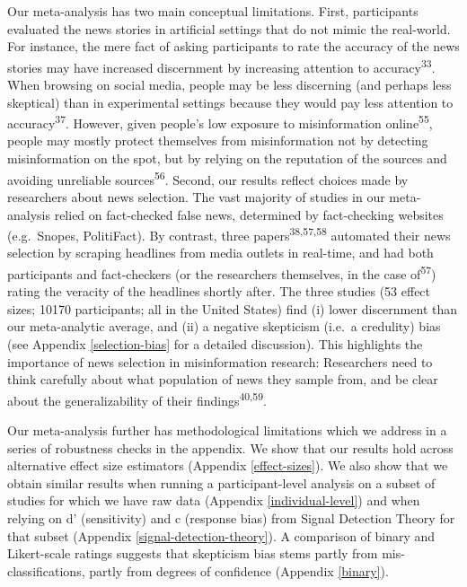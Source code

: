 \documentclass[
  man]{apa6}
\begin{document}
Our meta-analysis has two main conceptual limitations. First, participants evaluated the news stories in artificial settings that do not mimic the real-world. For instance, the mere fact of asking participants to rate the accuracy of the news stories may have increased discernment by increasing attention to accuracy\textsuperscript{33}. When browsing on social media, people may be less discerning (and perhaps less skeptical) than in experimental settings because they would pay less attention to accuracy\textsuperscript{37}. However, given people's low exposure to misinformation online\textsuperscript{55}, people may mostly protect themselves from misinformation not by detecting misinformation on the spot, but by relying on the reputation of the sources and avoiding unreliable sources\textsuperscript{56}. Second, our results reflect choices made by researchers about news selection. The vast majority of studies in our meta-analysis relied on fact-checked false news, determined by fact-checking websites (e.g.~Snopes, PolitiFact). By contrast, three papers\textsuperscript{38,57,58} automated their news selection by scraping headlines from media outlets in real-time, and had both participants and fact-checkers (or the researchers themselves, in the case of\textsuperscript{57}) rating the veracity of the headlines shortly after. The three studies (53 effect sizes; 10170 participants; all in the United States) find (i) lower discernment than our meta-analytic average, and (ii) a negative skepticism (i.e.~a credulity) bias (see Appendix \ref{selection-bias} for a detailed discussion). This highlights the importance of news selection in misinformation research: Researchers need to think carefully about what population of news they sample from, and be clear about the generalizability of their findings\textsuperscript{40,59}.

Our meta-analysis further has methodological limitations which we address in a series of robustness checks in the appendix. We show that our results hold across alternative effect size estimators (Appendix \ref{effect-sizes}). We also show that we obtain similar results when running a participant-level analysis on a subset of studies for which we have raw data (Appendix \ref{individual-level}) and when relying on d' (sensitivity) and c (response bias) from Signal Detection Theory for that subset (Appendix \ref{signal-detection-theory}). A comparison of binary and Likert-scale ratings suggests that skepticism bias stems partly from mis-classifications, partly from degrees of confidence (Appendix \ref{binary}).
\end{document}
